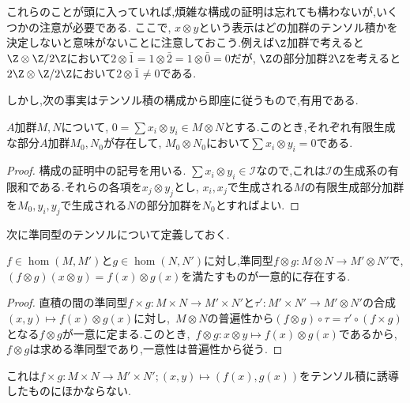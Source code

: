 これらのことが頭に入っていれば,煩雑な構成の証明は忘れても構わないが,いくつかの注意が必要である.
ここで, $x\otimes y$という表示はどの加群のテンソル積かを決定しないと意味がないことに注意しておこう.例えば$\Z$加群で考えると $\Z\otimes \Z/2\Z$において$2\otimes\bar{1}=1\otimes\bar{2}=1\otimes\bar{0}=0$だが, $\Z$の部分加群$2\Z$を考えると$2\Z\otimes\Z/2\Z$において$2\otimes\bar{1}\neq0$である.

しかし,次の事実はテンソル積の構成から即座に従うもので,有用である.

\begin{prop}\label{prop:テンソルの有限生成への制限}
	$A$加群$M,N$について, $0=\sum x_i\otimes y_i\in M\otimes N$とする.このとき,それぞれ有限生成な部分$A$加群$M_0,N_0$が存在して, $M_0\otimes N_0$において$\sum x_i\otimes y_i=0$である.
\end{prop}

\begin{proof}
	構成の証明中の記号を用いる. $\sum x_i\otimes y_i\in\mathcal{I}$なので,これは$\mathcal{I}$の生成系の有限和である.それらの各項を$x_j\otimes y_j$とし, $x_i,x_j$で生成される$M$の有限生成部分加群を$M_0, y_i,y_j$で生成される$N$の部分加群を$N_0$とすればよい.
\end{proof}

次に準同型のテンソルについて定義しておく.

\begin{prop}
	$f\in\hom(M,M')$と$g\in\hom(N,N')$に対し,準同型$f\otimes g:M\otimes N\to M'\otimes N'$で, $(f\otimes g)(x\otimes y)=f(x)\otimes g(x)$を満たすものが一意的に存在する.
\end{prop}
\begin{proof}
	直積の間の準同型$f\times g:M\times N\to M'\times N'$と$\tau':M'\times N'\to M'\otimes N'$の合成$(x,y)\mapsto f(x)\otimes g(x)$に対し,~$M\otimes N$の普遍性から$(f\otimes g)\circ\tau=\tau'\circ(f\times g)$となる$f\otimes g$が一意に定まる.このとき,~$f\otimes g:x\otimes y\mapsto f(x)\otimes g(x)$であるから,~$f\otimes g$は求める準同型であり,一意性は普遍性から従う.
\end{proof}
これは$f\times g:M\times N\to M'\times N';(x,y)\mapsto (f(x),g(x))$をテンソル積に誘導したものにほかならない.

